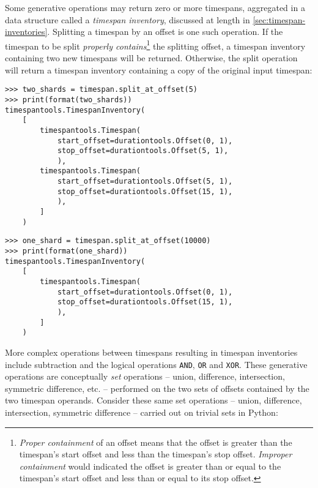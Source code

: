 \noindent Some generative operations may return zero or more timespans,
aggregated in a data structure called a \emph{timespan inventory}, discussed at
length in \autoref{sec:timespan-inventories}. Splitting a timespan by an offset
is one such operation. If the timespan to be split \emph{properly
contains}\footnote{\emph{Proper containment} of an offset means that the offset
is greater than the timespan's start offset and less than the timespan's stop
offset. \emph{Improper containment} would indicated the offset is greater than
or equal to the timespan's start offset and less than or equal to its stop
offset.} the splitting offset, a timespan inventory containing two new
timespans will be returned. Otherwise, the split operation will return a
timespan inventory containing a copy of the original input timespan:

\begin{comment}
<abjad>
two_shards = timespan.split_at_offset(5)
print(format(two_shards))
one_shard = timespan.split_at_offset(10000)
print(format(one_shard))
</abjad>
\end{comment}

\begin{abjadbookoutput}
\begin{singlespacing}
\vspace{-0.5\baselineskip}
\begin{lstlisting}
>>> two_shards = timespan.split_at_offset(5)
>>> print(format(two_shards))
timespantools.TimespanInventory(
    [
        timespantools.Timespan(
            start_offset=durationtools.Offset(0, 1),
            stop_offset=durationtools.Offset(5, 1),
            ),
        timespantools.Timespan(
            start_offset=durationtools.Offset(5, 1),
            stop_offset=durationtools.Offset(15, 1),
            ),
        ]
    )
\end{lstlisting}
\begin{lstlisting}
>>> one_shard = timespan.split_at_offset(10000)
>>> print(format(one_shard))
timespantools.TimespanInventory(
    [
        timespantools.Timespan(
            start_offset=durationtools.Offset(0, 1),
            stop_offset=durationtools.Offset(15, 1),
            ),
        ]
    )
\end{lstlisting}
\end{singlespacing}
\end{abjadbookoutput}

\noindent More complex operations between timespans resulting in timespan
inventories include subtraction and the logical operations
\texttt{AND}, \texttt{OR} and \texttt{XOR}. These generative operations are
conceptually \emph{set} operations -- union, difference, intersection,
symmetric difference, etc. -- performed on the two sets of offsets contained by
the two timespan operands. Consider these same set operations -- union,
difference, intersection, symmetric difference -- carried out on trivial sets
in Python:

